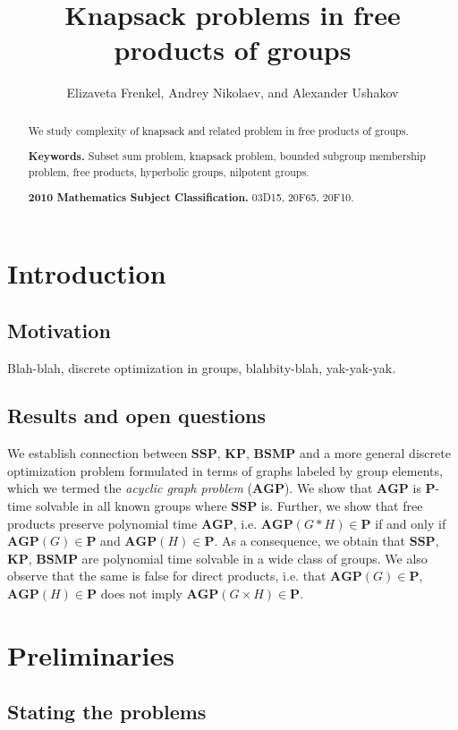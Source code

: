 \documentclass[11pt]{amsart}
\title{Knapsack problems in free products of groups}
\author[]{Elizaveta Frenkel, Andrey Nikolaev, and Alexander Ushakov}
\theoremstyle{definition}
\def\P{{\mathbf{P}}}
\def\SSP{{\mathbf{SSP}}}
\def\BSMP{{\mathbf{BSMP}}}
\def\KP{{\mathbf{KP}}}
\def\AGP{{\mathbf{AGP}}}
\begin{document}
\maketitle

\begin{abstract}
We study complexity of knapsack and related problem in free products of groups.

\noindent
{\bf Keywords.} Subset sum problem,  knapsack problem, bounded subgroup membership problem, free products, hyperbolic groups, nilpotent groups.

\noindent
{\bf 2010 Mathematics Subject Classification.} 03D15, 20F65, 20F10.
\end{abstract}

\tableofcontents

\section{Introduction}\label{sec:intro}


\subsection{Motivation}\label{sub:motivation}
Blah-blah, discrete optimization in groups, blahbity-blah, yak-yak-yak.

\subsection{Results and open questions}\label{sub:results}
We establish connection between $\SSP$, $\KP$, $\BSMP$ and a more general discrete optimization problem formulated in terms of graphs labeled by group elements, which we termed the {\em acyclic graph problem} ($\AGP$). We show that $\AGP$ is $\P$-time solvable in all known groups where $\SSP$ is. Further, we show that free products preserve polynomial time $\AGP$, i.e. $\AGP(G* H)\in\P$ if and only if $\AGP(G)\in\P$ and $\AGP(H)\in\P$. As a consequence, we obtain that $\SSP$, $\KP$, $\BSMP$ are polynomial time solvable in a wide class of groups. We also observe that the same is false for direct products, i.e. that $\AGP(G)\in\P$, $\AGP(H)\in\P$ does not imply $\AGP(G\times H)\in\P$.


\section{Preliminaries}\label{sec:prelim}
\subsection{Stating the problems} \label{sec:problems}
\end{document}
